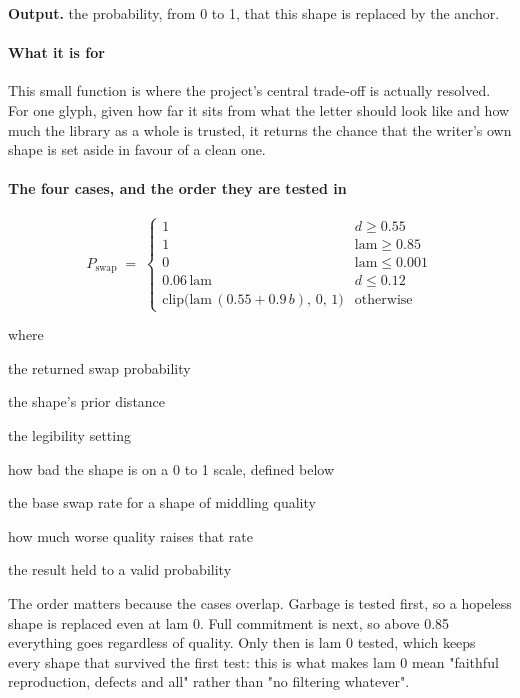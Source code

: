 \noindent\textbf{Output.} the probability, from 0 to 1, that this shape is replaced by the anchor.


\paragraph{What it is for}
This small function is where the project's central trade-off is actually resolved. For one glyph, given how far it sits from what the letter should look like and how much the library as a whole is trusted, it returns the chance that the writer's own shape is set aside in favour of a clean one.


\paragraph{The four cases, and the order they are tested in}

\begin{equation}
P_{\mathrm{swap}} \;=\; \begin{cases} 1 & d \ge 0.55 \\[3pt] 1 & \mathrm{lam} \ge 0.85 \\[3pt] 0 & \mathrm{lam} \le 0.001 \\[3pt] 0.06\,\mathrm{lam} & d \le 0.12 \\[3pt] \mathrm{clip}\big(\mathrm{lam}\,(0.55 + 0.9\,b),\,0,\,1\big) & \text{otherwise} \end{cases}
\end{equation}

\noindent where
\begin{description}[leftmargin=2.4em,style=nextline,font=\normalfont\ttfamily]\setlength\itemsep{1pt}
  \item[{$P_{\mathrm{swap}}$}] \normalfont the returned swap probability
  \item[{$d$}] \normalfont the shape's prior distance
  \item[{$\mathrm{lam}$}] \normalfont the legibility setting
  \item[{$b$}] \normalfont how bad the shape is on a 0 to 1 scale, defined below
  \item[{$0.55$}] \normalfont the base swap rate for a shape of middling quality
  \item[{$0.9$}] \normalfont how much worse quality raises that rate
  \item[{$\mathrm{clip}(\cdot,0,1)$}] \normalfont the result held to a valid probability
\end{description}
The order matters because the cases overlap. Garbage is tested first, so a hopeless shape is replaced even at lam 0. Full commitment is next, so above 0.85 everything goes regardless of quality. Only then is lam 0 tested, which keeps every shape that survived the first test: this is what makes lam 0 mean "faithful reproduction, defects and all" rather than "no filtering whatever".



